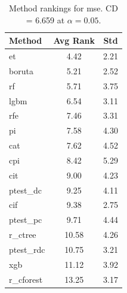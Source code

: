 \begin{table}[h]
\centering
\caption{Method rankings for mse. CD = 6.659 at $\alpha=0.05$.}
\label{tab:ranks_mse}
\begin{tabular}{lcc}
\toprule
Method & Avg Rank & Std \\
\midrule
et & 4.42 & 2.21 \\
boruta & 5.21 & 2.52 \\
rf & 5.71 & 3.75 \\
lgbm & 6.54 & 3.11 \\
rfe & 7.46 & 3.31 \\
pi & 7.58 & 4.30 \\
cat & 7.62 & 4.52 \\
cpi & 8.42 & 5.29 \\
cit & 9.00 & 4.23 \\
ptest_dc & 9.25 & 4.11 \\
cif & 9.38 & 2.75 \\
ptest_pc & 9.71 & 4.44 \\
r_ctree & 10.58 & 4.26 \\
ptest_rdc & 10.75 & 3.21 \\
xgb & 11.12 & 3.92 \\
r_cforest & 13.25 & 3.17 \\
\bottomrule
\end{tabular}
\end{table}